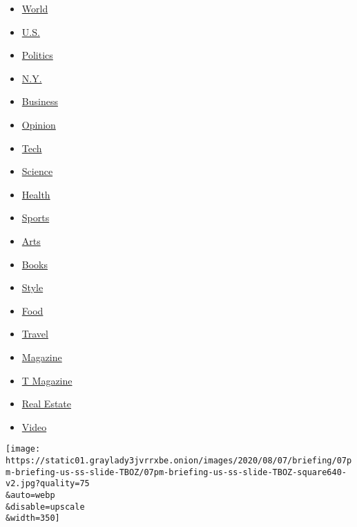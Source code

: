 \begin{itemize}
\tightlist
\item
  \href{https://www.nytimes3xbfgragh.onion/section/world}{World}
\item
  \href{https://www.nytimes3xbfgragh.onion/section/us}{U.S.}
\item
  \href{https://www.nytimes3xbfgragh.onion/section/politics}{Politics}
\item
  \href{https://www.nytimes3xbfgragh.onion/section/nyregion}{N.Y.}
\item
  \href{https://www.nytimes3xbfgragh.onion/section/business}{Business}
\item
  \href{https://www.nytimes3xbfgragh.onion/section/opinion}{Opinion}
\item
  \href{https://www.nytimes3xbfgragh.onion/section/technology}{Tech}
\item
  \href{https://www.nytimes3xbfgragh.onion/section/science}{Science}
\item
  \href{https://www.nytimes3xbfgragh.onion/section/health}{Health}
\item
  \href{https://www.nytimes3xbfgragh.onion/section/sports}{Sports}
\item
  \href{https://www.nytimes3xbfgragh.onion/section/arts}{Arts}
\item
  \href{https://www.nytimes3xbfgragh.onion/section/books}{Books}
\item
  \href{https://www.nytimes3xbfgragh.onion/section/style}{Style}
\item
  \href{https://www.nytimes3xbfgragh.onion/section/food}{Food}
\item
  \href{https://www.nytimes3xbfgragh.onion/section/travel}{Travel}
\item
  \href{https://www.nytimes3xbfgragh.onion/section/magazine}{Magazine}
\item
  \href{https://www.nytimes3xbfgragh.onion/section/t-magazine}{T
  Magazine}
\item
  \href{https://www.nytimes3xbfgragh.onion/section/realestate}{Real
  Estate}
\item
  \href{https://www.nytimes3xbfgragh.onion/video}{Video}
\end{itemize}

\href{/2020/08/07/briefing/jobs-school-reopenings-summer-desserts.html}{}

\texttt{[image: https://static01.graylady3jvrrxbe.onion/images/2020/08/07/briefing/07pm-briefing-us-ss-slide-TBOZ/07pm-briefing-us-ss-slide-TBOZ-square640-v2.jpg?quality=75\\\&auto=webp\\\&disable=upscale\\\&width=350]}

